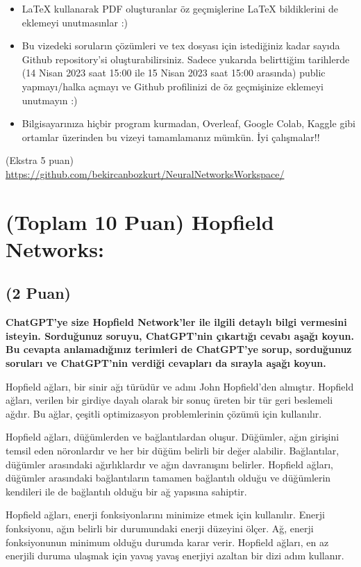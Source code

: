 \documentclass[11pt]{article}
\begin{document}
\begin{itemize}
    \item LaTeX kullanarak PDF oluşturanlar öz geçmişlerine LaTeX bildiklerini de eklemeyi unutmasınlar :)
    \item Bu vizedeki soruların çözümleri ve tex dosyası için istediğiniz kadar sayıda Github repository'si oluşturabilirsiniz. Sadece yukarıda belirttiğim tarihlerde (14 Nisan 2023 saat 15:00 ile 15 Nisan 2023 saat 15:00 arasında) public yapmayı/halka açmayı ve Github profilinizi de öz geçmişinize eklemeyi unutmayın :)
    \item Bilgisayarınıza hiçbir program kurmadan, Overleaf, Google Colab, Kaggle gibi ortamlar üzerinden bu vizeyi tamamlamanız mümkün. İyi çalışmalar!!
\end{itemize}

(Ekstra 5 puan) \url{https://github.com/bekircanbozkurt/NeuralNetworksWorkspace/}

\newpage
\section{(Toplam 10 Puan) Hopfield Networks:}

\subsection{(2 Puan)} \textbf{ChatGPT’ye size Hopfield Network’ler ile ilgili detaylı bilgi vermesini isteyin. Sorduğunuz soruyu, ChatGPT'nin çıkartığı cevabı aşağı koyun. Bu cevapta anlamadığınız terimleri de ChatGPT’ye sorup, sorduğunuz soruları ve ChatGPT’nin verdiği cevapları da sırayla aşağı koyun.}

Hopfield ağları, bir sinir ağı türüdür ve adını John Hopfield'den almıştır. Hopfield ağları, verilen bir girdiye dayalı olarak bir sonuç üreten bir tür geri beslemeli ağdır. Bu ağlar, çeşitli optimizasyon problemlerinin çözümü için kullanılır.

Hopfield ağları, düğümlerden ve bağlantılardan oluşur. Düğümler, ağın girişini temsil eden nöronlardır ve her bir düğüm belirli bir değer alabilir. Bağlantılar, düğümler arasındaki ağırlıklardır ve ağın davranışını belirler. Hopfield ağları, düğümler arasındaki bağlantıların tamamen bağlantılı olduğu ve düğümlerin kendileri ile de bağlantılı olduğu bir ağ yapısına sahiptir.

Hopfield ağları, enerji fonksiyonlarını minimize etmek için kullanılır. Enerji fonksiyonu, ağın belirli bir durumundaki enerji düzeyini ölçer. Ağ, enerji fonksiyonunun minimum olduğu durumda karar verir. Hopfield ağları, en az enerjili duruma ulaşmak için yavaş yavaş enerjiyi azaltan bir dizi adım kullanır.
\end{document}
